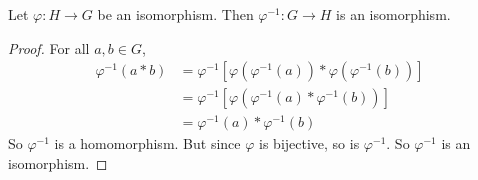 \begin{proposition}
	Let \(\varphi: H \to G\) be an isomorphism.
	Then \(\varphi^{-1}: G \to H\) is an isomorphism.
\end{proposition}
\begin{proof}
	For all \(a, b \in G\),
	\begin{align*}
		\varphi^{-1}(a \ast b) & = \varphi^{-1}\left[ \varphi(\varphi^{-1}(a)) \ast \varphi(\varphi^{-1}(b)) \right] \\
		                       & = \varphi^{-1}\left[ \varphi(\varphi^{-1}(a) \ast \varphi^{-1}(b)) \right]          \\
		                       & = \varphi^{-1}(a) \ast \varphi^{-1}(b)
	\end{align*}
	So \(\varphi^{-1}\) is a homomorphism.
	But since \(\varphi\) is bijective, so is \(\varphi^{-1}\).
	So \(\varphi^{-1}\) is an isomorphism.
\end{proof}


